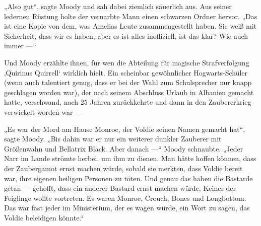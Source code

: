 „Also gut“, sagte Moody und sah dabei ziemlich säuerlich aus. Aus seiner ledernen Rüstung holte der vernarbte Mann einen schwarzen Ordner hervor.
„Das ist eine Kopie von dem, was Amelias Leute zusammengestellt haben. Sie weiß mit Sicherheit, dass wir es haben, aber es ist alles inoffiziell, ist das klar? Wie auch immer —“

Und Moody erzählte ihnen, für wen die Abteilung für magische Strafverfolgung ‚Quirinus Quirrell‘ wirklich hielt. Ein scheinbar gewöhnlicher Hogwarts-Schüler (wenn auch talentiert genug, dass er bei der Wahl zum Schulsprecher nur knapp geschlagen worden war), der nach seinem Abschluss Urlaub in Albanien gemacht hatte, verschwand, nach 25 Jahren zurückkehrte und dann in den Zaubererkrieg verwickelt worden war —

„Es war der Mord am Hause Monroe, der Voldie seinen Namen gemacht hat“, sagte Moody.
„Bis dahin war er nur ein weiterer dunkler Zauberer mit Größenwahn und Bellatrix Black. Aber danach —“ Moody schnaubte.
„Jeder Narr im Lande strömte herbei, um ihm zu dienen. Man hätte hoffen können, dass der Zaubergamot ernst machen würde, sobald sie merkten, dass Voldie bereit war, ihre eigenen heiligen Personen zu töten. Und genau das haben die Bastarde getan — gehofft, dass ein anderer Bastard ernst machen würde. Keiner der Feiglinge wollte vortreten. Es waren Monroe, Crouch, Bones und Longbottom. Das war fast jeder im Ministerium, der es wagen würde, ein Wort zu sagen, das Voldie beleidigen könnte.“

